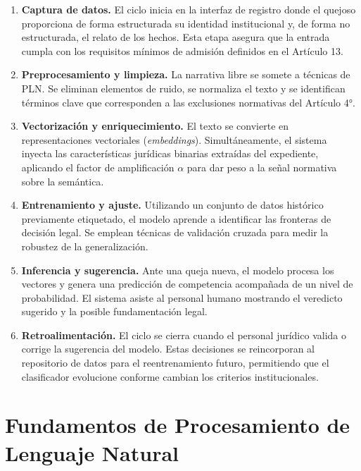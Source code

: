 \begin{enumerate}
  \item \textbf{Captura de datos.} El ciclo inicia en la interfaz de registro
        donde el quejoso proporciona de forma estructurada su identidad
        institucional y, de forma no estructurada, el relato de los hechos.
        Esta etapa asegura que la entrada cumpla con los requisitos mínimos de
        admisión definidos en el Artículo 13.

  \item \textbf{Preprocesamiento y limpieza.} La narrativa libre se somete a
        técnicas de PLN. Se eliminan elementos de ruido, se normaliza el texto
        y se identifican términos clave que corresponden a las exclusiones
        normativas del Artículo 4°.

  \item \textbf{Vectorización y enriquecimiento.} El texto se convierte en
        representaciones vectoriales (\textit{embeddings}). Simultáneamente,
        el sistema inyecta las características jurídicas binarias extraídas del
        expediente, aplicando el factor de amplificación $\alpha$ para dar peso
        a la señal normativa sobre la semántica.

  \item \textbf{Entrenamiento y ajuste.} Utilizando un conjunto de datos
        histórico previamente etiquetado, el modelo aprende a identificar las
        fronteras de decisión legal. Se emplean técnicas de validación cruzada
        para medir la robustez de la generalización.

  \item \textbf{Inferencia y sugerencia.} Ante una queja nueva, el modelo
        procesa los vectores y genera una predicción de competencia acompañada
        de un nivel de probabilidad. El sistema asiste al personal humano
        mostrando el veredicto sugerido y la posible fundamentación legal.

  \item \textbf{Retroalimentación.} El ciclo se cierra cuando el personal
        jurídico valida o corrige la sugerencia del modelo. Estas decisiones
        se reincorporan al repositorio de datos para el reentrenamiento futuro,
        permitiendo que el clasificador evolucione conforme cambian los criterios
        institucionales.
\end{enumerate}

\section{Fundamentos de Procesamiento de Lenguaje Natural}

